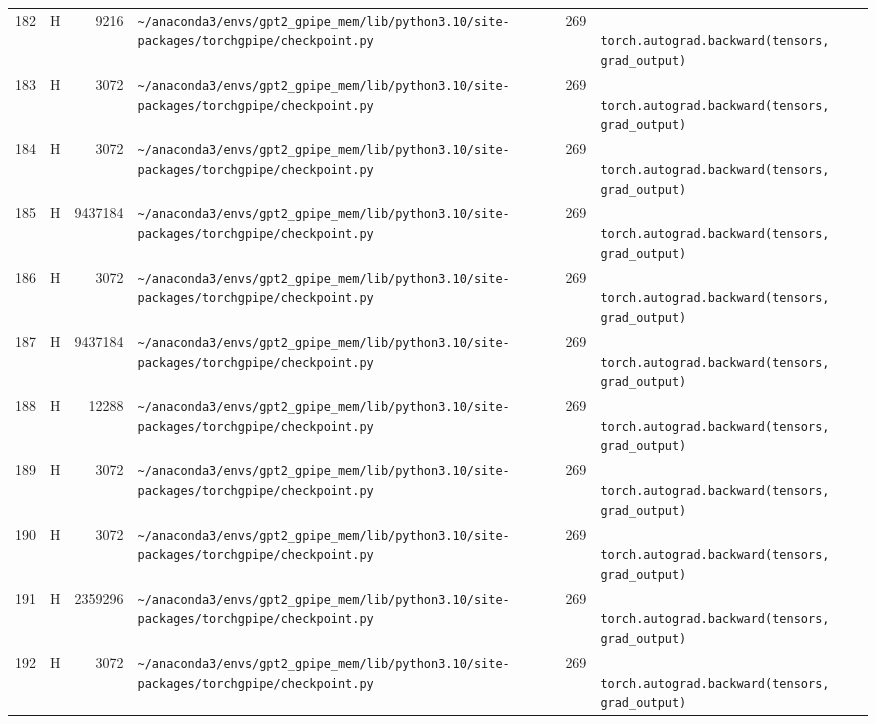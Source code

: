 \documentclass{article}
\begin{document}
\begin{longtable}{r l r p{6.5cm} r p{7.0cm}}
182 & H & 9216 & \lstinline|~/anaconda3/envs/gpt2_gpipe_mem/lib/python3.10/site-packages/torchgpipe/checkpoint.py| & 269 & \lstinline|            torch.autograd.backward(tensors, grad_output)| \\
183 & H & 3072 & \lstinline|~/anaconda3/envs/gpt2_gpipe_mem/lib/python3.10/site-packages/torchgpipe/checkpoint.py| & 269 & \lstinline|            torch.autograd.backward(tensors, grad_output)| \\
184 & H & 3072 & \lstinline|~/anaconda3/envs/gpt2_gpipe_mem/lib/python3.10/site-packages/torchgpipe/checkpoint.py| & 269 & \lstinline|            torch.autograd.backward(tensors, grad_output)| \\
185 & H & 9437184 & \lstinline|~/anaconda3/envs/gpt2_gpipe_mem/lib/python3.10/site-packages/torchgpipe/checkpoint.py| & 269 & \lstinline|            torch.autograd.backward(tensors, grad_output)| \\
186 & H & 3072 & \lstinline|~/anaconda3/envs/gpt2_gpipe_mem/lib/python3.10/site-packages/torchgpipe/checkpoint.py| & 269 & \lstinline|            torch.autograd.backward(tensors, grad_output)| \\
187 & H & 9437184 & \lstinline|~/anaconda3/envs/gpt2_gpipe_mem/lib/python3.10/site-packages/torchgpipe/checkpoint.py| & 269 & \lstinline|            torch.autograd.backward(tensors, grad_output)| \\
188 & H & 12288 & \lstinline|~/anaconda3/envs/gpt2_gpipe_mem/lib/python3.10/site-packages/torchgpipe/checkpoint.py| & 269 & \lstinline|            torch.autograd.backward(tensors, grad_output)| \\
189 & H & 3072 & \lstinline|~/anaconda3/envs/gpt2_gpipe_mem/lib/python3.10/site-packages/torchgpipe/checkpoint.py| & 269 & \lstinline|            torch.autograd.backward(tensors, grad_output)| \\
190 & H & 3072 & \lstinline|~/anaconda3/envs/gpt2_gpipe_mem/lib/python3.10/site-packages/torchgpipe/checkpoint.py| & 269 & \lstinline|            torch.autograd.backward(tensors, grad_output)| \\
191 & H & 2359296 & \lstinline|~/anaconda3/envs/gpt2_gpipe_mem/lib/python3.10/site-packages/torchgpipe/checkpoint.py| & 269 & \lstinline|            torch.autograd.backward(tensors, grad_output)| \\
192 & H & 3072 & \lstinline|~/anaconda3/envs/gpt2_gpipe_mem/lib/python3.10/site-packages/torchgpipe/checkpoint.py| & 269 & \lstinline|            torch.autograd.backward(tensors, grad_output)| \\

\end{longtable}
\end{document}
